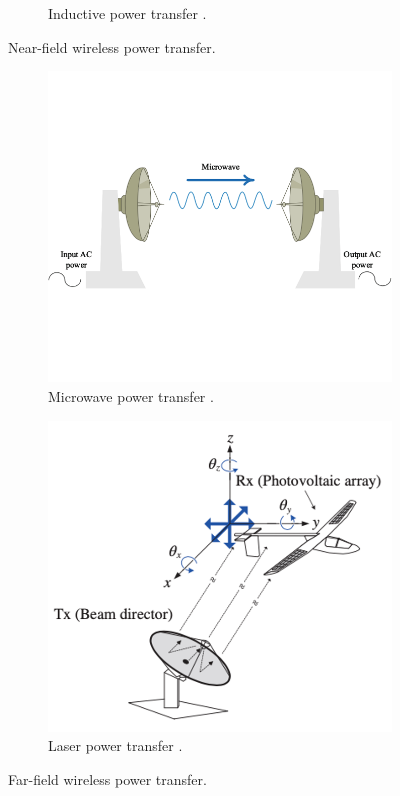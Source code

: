\begin{figure}[!t]
\begin{subfigure}{0.5\textwidth}
        \caption{Inductive power transfer \cite{Chun}.}
        \label{fig:subim2}
    \end{subfigure}

    \caption{Near-field wireless power transfer.}
    \label{fig:near-fieldwpt}
\end{figure}


\begin{figure}[!t]
    \begin{subfigure}{0.5\textwidth}
        \centering
        \includegraphics[width=0.9\linewidth]{images/1_microwave_power_transfer.png}
        \caption{Microwave power transfer \cite{Orekan}.}
        \label{fig:subim1}
    \end{subfigure}
    \begin{subfigure}{0.5\textwidth}
        \centering
        \includegraphics[width=0.9\linewidth]{images/1_laser_power_transfer.png}
        \caption{Laser power transfer \cite{Chun}.}
        \label{fig:subim2}
    \end{subfigure}

    \caption{Far-field wireless power transfer.}
    \label{fig:far-fieldwpt}
\end{figure}

